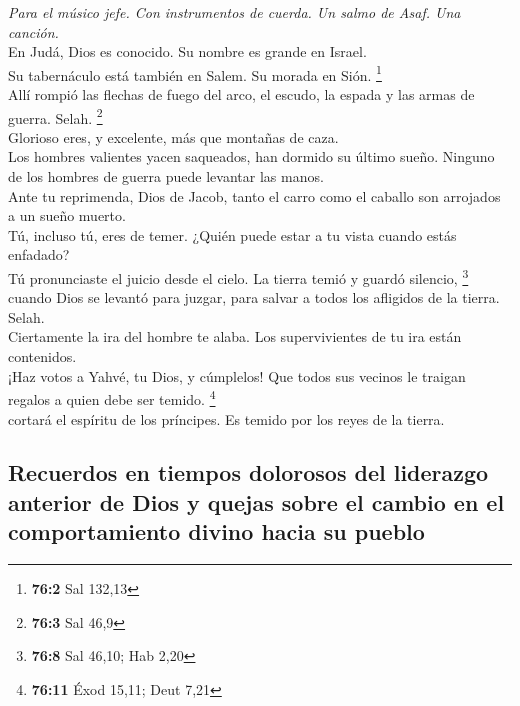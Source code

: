 \emph{Para el músico jefe. Con instrumentos de cuerda. Un salmo de Asaf.
Una canción.}\\
 En Judá, Dios es conocido. Su nombre es grande en
Israel.\\
 Su tabernáculo está también en Salem. Su morada en Sión.
\footnote{\textbf{76:2} Sal 132,13}\\
 Allí rompió las flechas de fuego del arco, el escudo, la
espada y las armas de guerra. Selah. \footnote{\textbf{76:3} Sal 46,9}\\
 Glorioso eres, y excelente, más que montañas de caza.\\
 Los hombres valientes yacen saqueados, han dormido su
último sueño. Ninguno de los hombres de guerra puede levantar las
manos.\\
 Ante tu reprimenda, Dios de Jacob, tanto el carro como el
caballo son arrojados a un sueño muerto.\\
 Tú, incluso tú, eres de temer. ¿Quién puede estar a tu
vista cuando estás enfadado?\\
 Tú pronunciaste el juicio desde el cielo. La tierra temió
y guardó silencio, \footnote{\textbf{76:8} Sal 46,10; Hab 2,20}\\
 cuando Dios se levantó para juzgar, para salvar a todos
los afligidos de la tierra. Selah.\\
 Ciertamente la ira del hombre te alaba. Los
supervivientes de tu ira están contenidos.\\
 ¡Haz votos a Yahvé, tu Dios, y cúmplelos! Que todos sus
vecinos le traigan regalos a quien debe ser temido. \footnote{\textbf{76:11}
  Éxod 15,11; Deut 7,21}\\
 cortará el espíritu de los príncipes. Es temido por los
reyes de la tierra.

\hypertarget{recuerdos-en-tiempos-dolorosos-del-liderazgo-anterior-de-dios-y-quejas-sobre-el-cambio-en-el-comportamiento-divino-hacia-su-pueblo}{%
\subsection{Recuerdos en tiempos dolorosos del liderazgo anterior de
Dios y quejas sobre el cambio en el comportamiento divino hacia su
pueblo}\label{recuerdos-en-tiempos-dolorosos-del-liderazgo-anterior-de-dios-y-quejas-sobre-el-cambio-en-el-comportamiento-divino-hacia-su-pueblo}}

